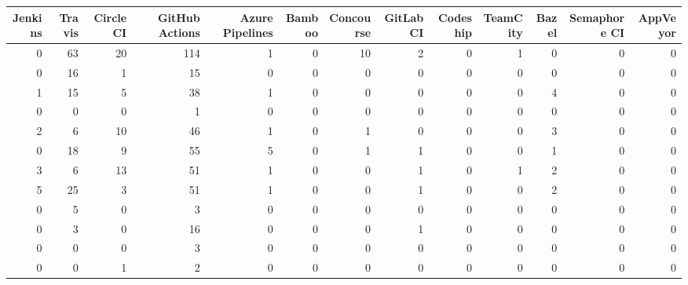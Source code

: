 \begin{tabular}{rrrrrrrrrrrrr}
\toprule
 Jenkins &  Travis &  Circle CI &  GitHub Actions &  Azure Pipelines &  Bamboo &  Concourse &  GitLab CI &  Codeship &  TeamCity &  Bazel &  Semaphore CI &  AppVeyor \\
\midrule
       0 &      63 &         20 &             114 &                1 &       0 &         10 &          2 &         0 &         1 &      0 &             0 &         0 \\
       0 &      16 &          1 &              15 &                0 &       0 &          0 &          0 &         0 &         0 &      0 &             0 &         0 \\
       1 &      15 &          5 &              38 &                1 &       0 &          0 &          0 &         0 &         0 &      4 &             0 &         0 \\
       0 &       0 &          0 &               1 &                0 &       0 &          0 &          0 &         0 &         0 &      0 &             0 &         0 \\
       2 &       6 &         10 &              46 &                1 &       0 &          1 &          0 &         0 &         0 &      3 &             0 &         0 \\
       0 &      18 &          9 &              55 &                5 &       0 &          1 &          1 &         0 &         0 &      1 &             0 &         0 \\
       3 &       6 &         13 &              51 &                1 &       0 &          0 &          1 &         0 &         1 &      2 &             0 &         0 \\
       5 &      25 &          3 &              51 &                1 &       0 &          0 &          1 &         0 &         0 &      2 &             0 &         0 \\
       0 &       5 &          0 &               3 &                0 &       0 &          0 &          0 &         0 &         0 &      0 &             0 &         0 \\
       0 &       3 &          0 &              16 &                0 &       0 &          0 &          1 &         0 &         0 &      0 &             0 &         0 \\
       0 &       0 &          0 &               3 &                0 &       0 &          0 &          0 &         0 &         0 &      0 &             0 &         0 \\
       0 &       0 &          1 &               2 &                0 &       0 &          0 &          0 &         0 &         0 &      0 &             0 &         0 \\

\end{tabular}
